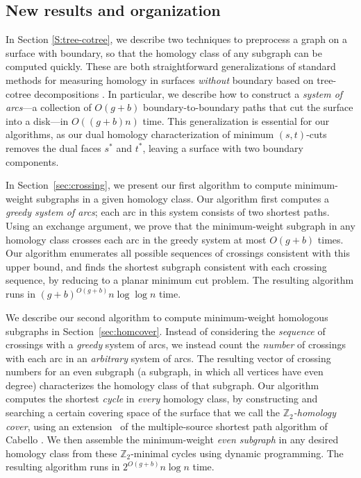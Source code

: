 \documentclass[letterpaper,review]{siamart190516}
\def\Z{\mathbb{Z}}
\begin{document}
\subsection{New results and organization}

In Section \ref{S:tree-cotree}, we describe two techniques to preprocess a graph on a surface with boundary, so that the homology class of any subgraph can be computed quickly.  These are both straightforward generalizations of standard methods for measuring homology in surfaces \emph{without} boundary based on tree-cotree decompositions \cite{ew-gohhg-05, ccelw-scsih-08, e-dgteg-03}.  In particular, we describe how to construct a \emph{system of arcs}---a collection of $O(g+b)$ boundary-to-boundary paths that cut the surface into a disk---in $O((g+b)n)$ time.  This generalization is essential for our algorithms, as our dual homology characterization of minimum $(s,t)$-cuts removes the dual faces $s^*$ and $t^*$, leaving a surface with two boundary components.

In Section~\ref{sec:crossing}, we present our first algorithm to compute minimum-weight subgraphs in a given homology class.  Our algorithm first computes a \emph{greedy system of arcs}; each arc in this system consists of two shortest paths.  Using an exchange argument, we prove that the minimum-weight subgraph in any homology class crosses each arc in the greedy system at most $O(g+b)$ times.  Our algorithm enumerates all possible sequences of crossings consistent with this upper bound, and finds the shortest subgraph consistent with each crossing sequence, by reducing to a planar minimum cut problem.  The resulting algorithm runs  in $(g+b)^{O(g+b)}n\log \log n$ time.

We describe our second algorithm to compute minimum-weight homologous subgraphs in
Section~\ref{sec:homcover}.  Instead of considering the \emph{sequence} of crossings with a
\emph{greedy} system of arcs, we instead count the \emph{number} of crossings with each arc in an
\emph{arbitrary} system of arcs.  The resulting vector of crossing numbers for an even subgraph (a subgraph, in which all vertices have even degree)
characterizes the homology class of that subgraph.  Our algorithm computes the shortest \emph{cycle}
in \emph{every} homology class, by constructing and searching a certain covering space of the
surface  that we call the \emph{$\Z_2$-homology cover}, using an extension~\cite{efl-hmcpf-18} of the multiple-source shortest path algorithm of Cabello \etal \cite{cce-msspe-13}.  We then assemble the minimum-weight \emph{even subgraph} in any desired homology class from these $\Z_2$-minimal cycles using dynamic programming.  The resulting algorithm runs in $2^{O(g+b)}n\log n$ time.
\end{document}
